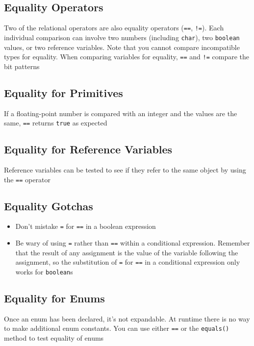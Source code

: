 \subsection{Equality Operators}
Two of the relational operators are also equality operators (\verb#==#, 
\verb#!=#). Each individual comparison can involve two numbers (including 
\verb#char#), two \verb#boolean# values, or two reference variables. Note that 
you cannot compare incompatible types for equality. When comparing variables 
for equality, \verb#==# and \verb#!=# compare the bit patterns

\subsection{Equality for Primitives}
If a floating-point number is compared with an integer and the values are the 
same, \verb#==# returns \verb#true# as expected

\subsection{Equality for Reference Variables}
Reference variables can be tested to see if they refer to the same object by 
using the \verb#==# operator

\subsection{Equality Gotchas}
\begin{itemize}
    \item Don't mistake \verb#=# for \verb#==# in a boolean expression
    \item Be wary of using \verb#=# rather than \verb#==# within a conditional 
    expression. Remember that the result of any assignment is the value of the 
    variable following the assignment, so the substitution of \verb#=# for 
    \verb#==# in a conditional expression only works for \verb#boolean#s
\end{itemize}

\subsection{Equality for Enums}
Once an enum has been declared, it's not expandable. At runtime there is no way 
to make additional enum constants. You can use either \verb#==# or the 
\verb#equals()# method to test equality of enums

